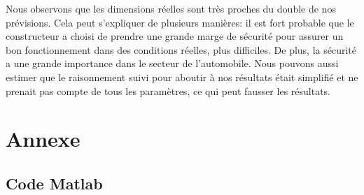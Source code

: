 \documentclass[a4paper,oneside,12pt]{report}
\begin{document}
Nous observons que les dimensions réelles sont très proches du double de nos prévisions. Cela peut s'expliquer de plusieurs manières: il est fort probable que le constructeur a choisi de prendre une grande marge de sécurité pour assurer un bon fonctionnement dans des conditions réelles, plus difficiles. De plus, la sécurité a une grande importance dans le secteur de l'automobile. Nous pouvons aussi estimer que le raisonnement suivi pour aboutir à nos résultats était simplifié et ne prenait pas compte de tous les paramètres, ce qui peut fausser les résultats.

\chapter{Annexe}

\section{Code Matlab}
\end{document}

